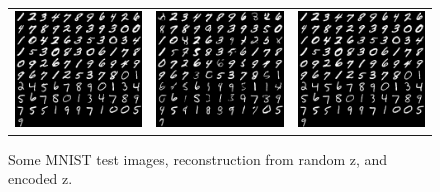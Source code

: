 \documentclass[twoside]{article}
\theoremstyle{definition}
\begin{document}
\begin{figure}[H]
\centering
\begin{tabular}{ccc}
\includegraphics[width=2in]{original_d.png} &
\includegraphics[width=2in]{reconstr_random_z.png} &
\includegraphics[width=2in]{reconstr_encoded.png}
\end{tabular}
\caption{Some MNIST test images, reconstruction from random z, and encoded z.}
\end{figure}




\end{document}
